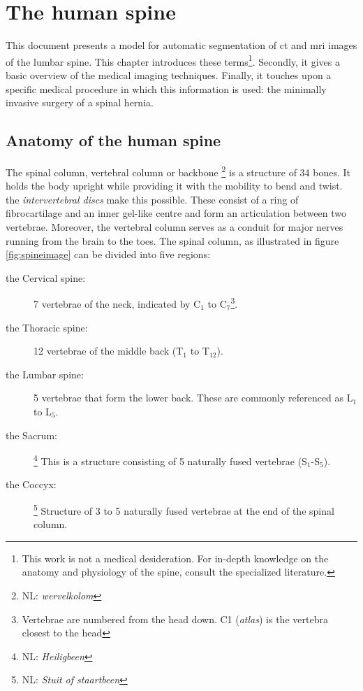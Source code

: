 \chapter{The human spine}

This document presents a model for automatic segmentation of \acrfull{ct} and \acrfull{mri} images of the lumbar spine.
This chapter introduces these terms\footnote{This work is not a medical desideration. For in-depth knowledge on the anatomy and physiology of the spine, consult the specialized literature.}.
Secondly, it gives a basic overview of the medical imaging techniques. 
Finally, it touches upon a specific medical procedure in which this information is used: the minimally invasive surgery of a spinal hernia.


\section{Anatomy of the human spine}

The spinal column, vertebral column or backbone \footnote{NL: \textit{wervelkolom}} is a structure of 34 bones. 
It holds the body upright while providing it with the mobility to bend and twist.
the \textit{intervertebral discs} make this possible. These consist of a ring of fibrocartilage and an inner gel-like centre and form an articulation between two vertebrae.
Moreover, the vertebral column serves as a conduit for major nerves running from the brain to the toes.
The spinal column, as illustrated in figure \ref{fig:spineimage} can be divided into five regions:
\begin{description}
    \item[the Cervical spine:] 7 vertebrae of the neck, indicated by C$_1$ to C$_7$\footnote{Vertebrae are numbered from the head down. C1 (\textit{atlas}) is the vertebra closest to the head}.
    \item[the Thoracic spine:] 12 vertebrae of the middle back (T$_1$ to T$_{12}$).
    \item[the Lumbar spine:] 5 vertebrae that form the lower back. These are commonly referenced as L$_1$ to L$_5$.
    \item[the Sacrum:]\footnote{NL: \textit{Heiligbeen}} This is a structure consisting of 5 naturally fused vertebrae (S$_1$-S$_5$).
    \item[the Coccyx:]\footnote{NL: \textit{Stuit of staartbeen}} Structure of 3 to 5 naturally fused vertebrae at the end of the spinal column.
\end{description}


